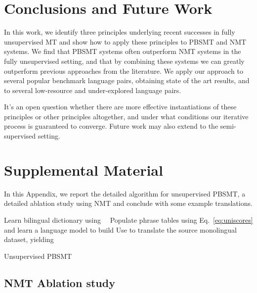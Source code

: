 \documentclass[11pt,a4paper]{article}
\begin{document}
\section{Conclusions and Future Work} \label{sec:conclusions}

In this work, we identify three principles underlying recent successes in fully unsupervised MT and show how to apply these principles to PBSMT and NMT systems.
We find that PBSMT systems often outperform NMT systems in the fully unsupervised setting, and that by combining these systems we can greatly outperform previous approaches from the literature.
We apply our approach to several popular benchmark language pairs, obtaining state of the art results, and to several low-resource and under-explored language pairs.

It's an open question whether there are more effective instantiations of these principles or other principles altogether, and under what conditions our iterative process is guaranteed to converge. Future work may also extend to the semi-supervised setting.




\clearpage
\appendix

\section{Supplemental Material}\label{sec:supplemental}
In this Appendix, we report the detailed algorithm for unsupervised PBSMT, a detailed ablation study using NMT and conclude with some example translations.

\begin{algorithm}[h!]
\SetAlgoLined
Learn bilingual dictionary using~~\citet{wordalign17}\;
Populate phrase tables using Eq.~\ref{eq:uniscores} and learn a language model to build \;
Use  to translate the source monolingual dataset, yielding \;
\caption{Unsupervised PBSMT}
\label{alg:unsupPBSMT}
\end{algorithm}

\vspace{-0.05cm}
\subsection{NMT Ablation study}
\end{document}
